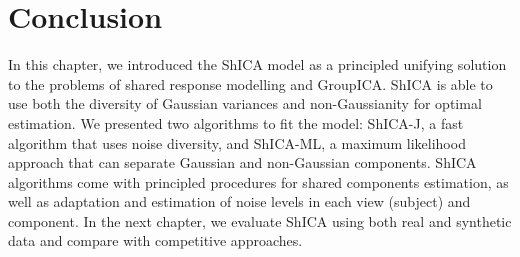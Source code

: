 \section{Conclusion}
In this chapter, we introduced the ShICA model as a principled unifying solution to the problems of shared response modelling and GroupICA. ShICA is able to use both the diversity of Gaussian variances and non-Gaussianity for optimal estimation. We presented two algorithms to fit the model: ShICA-J, a fast algorithm that uses noise diversity, and ShICA-ML, a maximum likelihood approach that can separate Gaussian and non-Gaussian components. ShICA algorithms come with principled procedures for shared components estimation, as well as adaptation and estimation of noise levels in each view (subject) and component.
In the next chapter, we evaluate ShICA using both real and synthetic data and
compare with competitive approaches.

